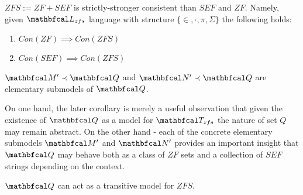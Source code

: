 \begin{theorem}\label{zfs_st_con}
  $ZFS := ZF + SEF$ is strictly-stronger consistent than $SEF$ and $ZF$. Namely, given $\lsign_{zfs}$ language with structure $\{\in, \cdot, \pi, \Sigma\}$ the following holds:
  \begin{enumerate}[1.]
    \item $Con(ZF) \implies Con(ZFS)$
    \item $Con(SEF) \implies Con(ZFS)$
  \end{enumerate}
\end{theorem}

    
  

  






  





\begin{corollary}
  $\LsM^\prime \prec \LsQ$ and $\LsN^\prime \prec \LsQ$ are elementary submodels of $\LsQ$.
\end{corollary}

On one hand, the later corollary is merely a useful observation that given the existence of $\LsQ$ as a model for $\LsT_{zfs}$ the nature of set $Q$ may remain abstract. On the other hand - each of the concrete elementary submodels $\LsM^\prime$ and $\LsN^\prime$ provides an important insight that $\LsQ$ may behave both as a class of $ZF$ sets and a collection of $SEF$ strings depending on the context.

\begin{corollary}
  $\LsQ$ can act as a transitive model for $ZFS$.
\end{corollary}





